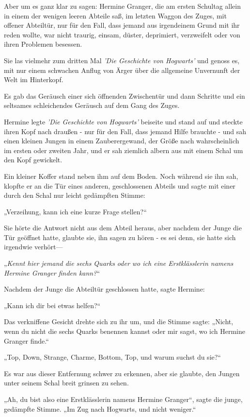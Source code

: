 {Aber um es ganz klar zu sagen: Hermine Granger, die am ersten Schultag allein in einem der wenigen leeren Abteile saß, im letzten Waggon des Zuges, mit offener Abteiltür, nur für den Fall, dass jemand aus irgendeinem Grund mit ihr reden wollte, war nicht traurig, einsam, düster, deprimiert, verzweifelt oder von ihren Problemen besessen.

Sie las vielmehr zum dritten Mal \emph{'Die Geschichte von Hogwarts'} und genoss es, mit nur einem schwachen Anflug von Ärger über die allgemeine Unvernunft der Welt im Hinterkopf.

Es gab das Geräusch einer sich öffnenden Zwischentür und dann Schritte und ein seltsames schleichendes Geräusch auf dem Gang des Zuges.

Hermine legte \emph{'Die Geschichte von Hogwarts'} beiseite und stand auf und steckte ihren Kopf nach draußen - nur für den Fall, dass jemand Hilfe brauchte - und sah einen kleinen Jungen in einem Zauberergewand, der Größe nach wahrscheinlich im ersten oder zweiten Jahr, und er sah ziemlich albern aus mit einem Schal um den Kopf gewickelt.

Ein kleiner Koffer stand neben ihm auf dem Boden. Noch während sie ihn sah, klopfte er an die Tür eines anderen, geschlossenen Abteils und sagte mit einer durch den Schal nur leicht gedämpften Stimme:

„Verzeihung, kann ich eine kurze Frage stellen?“

Sie hörte die Antwort nicht aus dem Abteil heraus, aber nachdem der Junge die Tür geöffnet hatte, glaubte sie, ihn sagen zu hören - es sei denn, sie hatte sich irgendwie verhört—

„\emph{Kennt hier jemand die sechs Quarks oder wo ich eine Erstklässlerin namens Hermine Granger finden kann?}“

Nachdem der Junge die Abteiltür geschlossen hatte, sagte Hermine:

„Kann ich dir bei etwas helfen?“

Das verkniffene Gesicht drehte sich zu ihr um, und die Stimme sagte: „Nicht, wenn du nicht die sechs Quarks benennen kannst oder mir sagst, wo ich Hermine Granger finde.“

„Top, Down, Strange, Charme, Bottom, Top, und warum suchst du sie?“

Es war aus dieser Entfernung schwer zu erkennen, aber sie glaubte, den Jungen unter seinem Schal breit grinsen zu sehen.

„Ah, du bist also eine Erstklässlerin namens Hermine Granger“, sagte die junge, gedämpfte Stimme. „Im Zug nach Hogwarts, und nicht weniger.“

}
